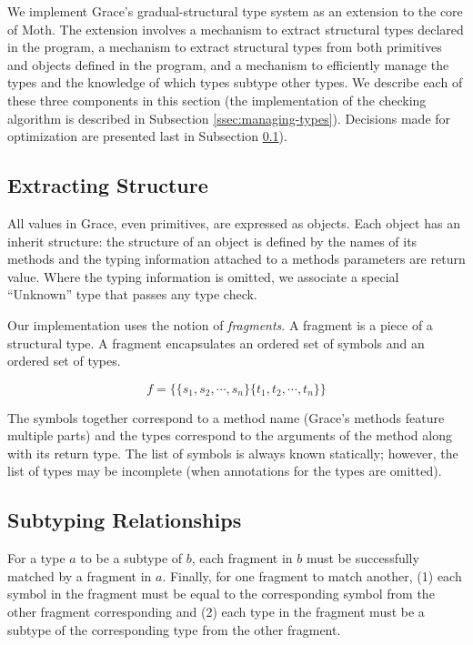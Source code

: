 We implement Grace's gradual-structural type system as an extension to the core of Moth. The extension involves a mechanism to extract structural types declared in the program, a mechanism to extract structural types from both primitives and objects defined in the program, and a mechanism to efficiently manage the types and the knowledge of which types subtype other types. We describe each of these three components in this section (the implementation of the checking algorithm is described in Subsection \ref{ssec:managing-types}). Decisions made for optimization are presented last in Subsection \ref{ssec:optimization-details}). 

\subsection{Extracting Structure}
\label{ssec:optimization-details}

All values in Grace, even primitives, are expressed as objects. Each object has an inherit structure: the structure of an object is defined by the names of its methods and the typing information attached to a methods parameters are return value. Where the typing information is omitted, we associate a special ``Unknown'' type that passes any type check.

Our implementation uses the notion of \emph{fragments}. A fragment is a piece of a structural type. A fragment encapsulates an ordered set of symbols and an ordered set of types.

\begin{equation}
f = \{   \{ s_1, s_2, \cdots, s_n \}   \{ t_1, t_2, \cdots, t_n \}  \}
\end{equation}

The symbols together correspond to a method name (Grace's methods feature multiple parts) and the types correspond to the arguments of the method along with its return type. The list of symbols is always known statically; however, the list of types may be incomplete (when annotations for the types are omitted).

\subsection{Subtyping Relationships}
\label{ssec:subtyping-relationships}

For a type $a$ to be a subtype of $b$, each fragment in $b$ must be successfully matched by a fragment in $a$. Finally, for one fragment to match another, (1) each symbol in the fragment must be equal to the corresponding symbol from the other fragment corresponding and (2) each type in the fragment must be a subtype of the corresponding type from the other fragment. 

